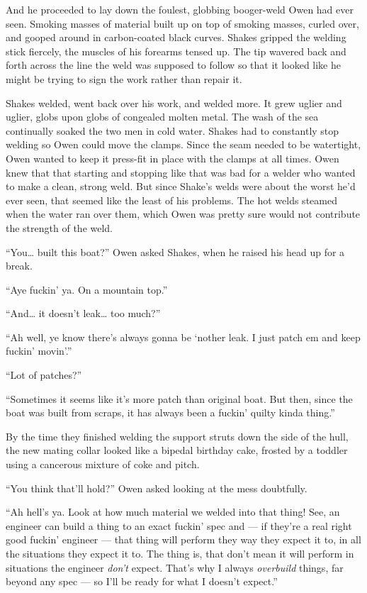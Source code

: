 \documentclass[
]{scrbook}
\begin{document}
And he proceeded to lay down the foulest, globbing booger-weld Owen had
ever seen. Smoking masses of material built up on top of smoking masses,
curled over, and gooped around in carbon-coated black curves. Shakes
gripped the welding stick fiercely, the muscles of his forearms tensed
up. The tip wavered back and forth across the line the weld was supposed
to follow so that it looked like he might be trying to sign the work
rather than repair it.

Shakes welded, went back over his work, and welded more. It grew uglier
and uglier, globs upon globs of congealed molten metal. The wash of the
sea continually soaked the two men in cold water. Shakes had to
constantly stop welding so Owen could move the clamps. Since the seam
needed to be watertight, Owen wanted to keep it press-fit in place with
the clamps at all times. Owen knew that that starting and stopping like
that was bad for a welder who wanted to make a clean, strong weld. But
since Shake's welds were about the worst he'd ever seen, that seemed
like the least of his problems. The hot welds steamed when the water ran
over them, which Owen was pretty sure would not contribute the strength
of the weld.

``You\ldots{} built this boat?'' Owen asked Shakes, when he raised his
head up for a break.

``Aye fuckin' ya. On a mountain top.''

``And\ldots{} it doesn't leak\ldots{} too much?''

``Ah well, ye know there's always gonna be `nother leak. I just patch em
and keep fuckin' movin'.''

``Lot of patches?''

``Sometimes it seems like it's more patch than original boat. But then,
since the boat was built from scraps, it has always been a fuckin'
quilty kinda thing.''

By the time they finished welding the support struts down the side of
the hull, the new mating collar looked like a bipedal birthday cake,
frosted by a toddler using a cancerous mixture of coke and pitch.

``You think that'll hold?'' Owen asked looking at the mess doubtfully.

``Ah hell's ya. Look at how much material we welded into that thing!
See, an engineer can build a thing to an exact fuckin' spec and --- if
they're a real right good fuckin' engineer --- that thing will perform
they way they expect it to, in all the situations they expect it to. The
thing is, that don't mean it will perform in situations the engineer
\emph{don't} expect. That's why I always \emph{overbuild} things, far
beyond any spec --- so I'll be ready for what I doesn't expect.''
\end{document}
